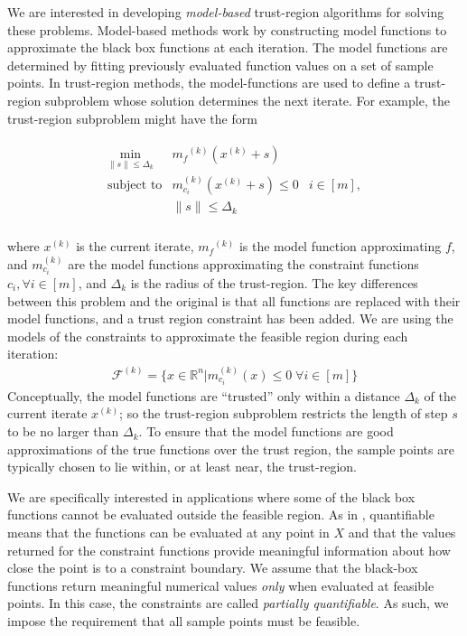 \documentclass{article}
\theoremstyle{case}
\numberwithin{theorem}{subsection}
\newcommand{\dk}{\Delta_k}
\newcommand{\feasiblek}{{\mathcal F^{(k)}}}
\newcommand{\mcik}{{{m}^{(k)}_{c_i}}}
\newcommand{\mfk}{{{m}_f}^{(k)}}
\newcommand{\Rn}{\mathbb R^n}
\newcommand{\xk}{x^{(k)}}
\begin{document}
We are interested in developing {\em model-based} trust-region algorithms for solving these problems.
Model-based methods work by constructing model functions to approximate the black box functions at each iteration.
The model functions are determined by fitting previously evaluated function values on a set of sample points.
In trust-region methods, the model-functions are used to define a trust-region subproblem whose solution determines the next iterate.
For example, the trust-region subproblem might have the form

\begin{align*}
\begin{array}{ccl} \min_{\|s\| \le \dk}
 & \mfk (\xk+s) \\
\mbox{subject to} & \mcik(\xk + s) \le 0 & i \in [m], \\
& \|s\| \le \dk \\
\end{array}
\end{align*}

where $\xk$ is the current iterate, $\mfk$ is the model function approximating $f$, 
and $\mcik$ are the model functions approximating the constraint functions $c_i, \forall i \in [m]$, and $\dk$ is the radius of the trust-region.
The key differences between this problem and the original is that all functions are replaced with their model functions, and a trust region constraint has been added.
We are using the models of the constraints to approximate the feasible region during each iteration:
\begin{align}
\feasiblek = \{x \in \Rn | \mcik(x) \le 0 \; \forall i \in [m] \} \label{define_feasiblek}
\end{align}
Conceptually, the model functions are ``trusted'' only within a distance $ \dk $ of the current iterate $\xk$; so the trust-region subproblem restricts the length of step $s$ to be no larger than $\dk$.
To ensure that the model functions are good approximations of the true functions over the trust region, the sample points are typically chosen to lie within, or at least near, the trust-region.


We are specifically interested in applications where some of the black box functions cannot be evaluated outside the feasible region.
As in \cite{digabel2015taxonomy}, quantifiable means that the functions can be evaluated at any point in $X$ and that the values returned for the constraint functions provide meaningful information about how close the point is to a constraint boundary.
We assume that the black-box functions return meaningful numerical values \emph{only} when evaluated at feasible points.
In this case, the constraints are called {\em partially quantifiable}.   
As such, we impose the requirement that all sample points must be feasible.
\end{document}
